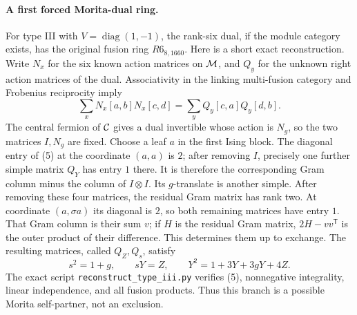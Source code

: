 \paragraph{A first forced Morita-dual ring.}
For type III with $V=\operatorname{diag}(1,-1)$, the rank-six dual,
if the module category exists, has the original fusion ring
$R6_{8,1660}$. Here is a short exact reconstruction.
Write $N_x$ for the six known action matrices on $\mathcal M$, and $Q_y$ for
the unknown right action matrices of the dual. Associativity in the
linking multi-fusion category and Frobenius reciprocity imply
\[
\sum_x N_x[a,b]N_x[c,d]
 =\sum_y Q_y[c,a]Q_y[d,b]. \tag{5}
\]
The central fermion of $\mathcal C$ gives a dual invertible whose action is
$N_g$, so the two matrices $I,N_g$ are fixed. Choose a leaf $a$ in the
first Ising block. The diagonal entry of (5) at the coordinate $(a,a)$
is $2$; after removing $I$, precisely one further simple matrix $Q_Y$
has entry $1$ there. It is therefore the corresponding Gram column
minus the column of $I\otimes I$. Its $g$-translate is another simple.
After removing these four matrices, the residual Gram matrix has rank
two. At coordinate $(a,\sigma a)$ its diagonal is $2$, so both remaining
matrices have entry $1$. That Gram column is their sum $v$; if $H$ is
the residual Gram matrix, $2H-vv^{\mathsf T}$ is the outer product of
their difference. This determines them up to exchange.
The resulting matrices, called $Q_Z,Q_s$, satisfy
\[
s^2=1+g,\qquad sY=Z,\qquad
Y^2=1+3Y+3gY+4Z.
\]
The exact script \texttt{reconstruct\_type\_iii.py} verifies (5),
nonnegative integrality, linear independence, and all fusion products.
Thus this branch is a possible Morita self-partner, not an exclusion.

